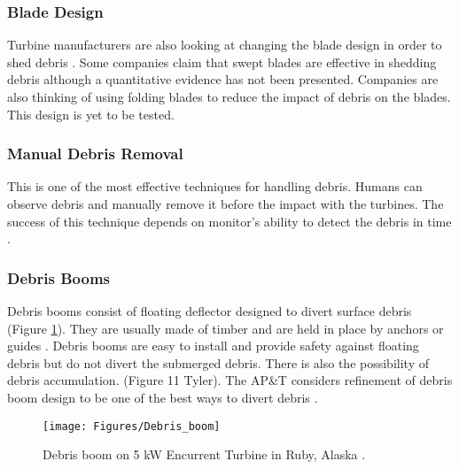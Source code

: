 \subsubsection{Blade Design}
Turbine manufacturers are also looking at changing the blade design in order to shed debris \cite{Reference1}. Some companies claim that swept blades are effective in shedding debris although a quantitative evidence has not been presented. Companies are also thinking of using folding blades to reduce the impact of debris on the blades. This design is yet to be tested.
\subsubsection{Manual Debris Removal}
This is one of the most effective techniques for handling debris. Humans can observe debris and manually remove it before the impact with the turbines. The success of this technique depends on monitor's ability to detect the debris in time \cite{Reference1}.
\subsubsection{Debris Booms}
Debris booms consist of floating deflector designed to divert surface debris (Figure \ref{fig:Debris_boom}). They are usually made of timber and are held in place by anchors or guides \cite{Reference5}. Debris booms are easy to install and provide safety against floating debris but do not divert the submerged debris. There is also the possibility of debris accumulation. (Figure 11 Tyler). The AP\&T considers refinement of debris boom design to be one of the best ways to divert debris \cite{Reference1}.  
\begin{figure}
\centering
\texttt{[image: Figures/Debris\_boom]}
\caption{\label{fig:Debris_boom}Debris boom on 5 kW Encurrent Turbine in Ruby, Alaska \cite{Reference1}.}
\end{figure}
